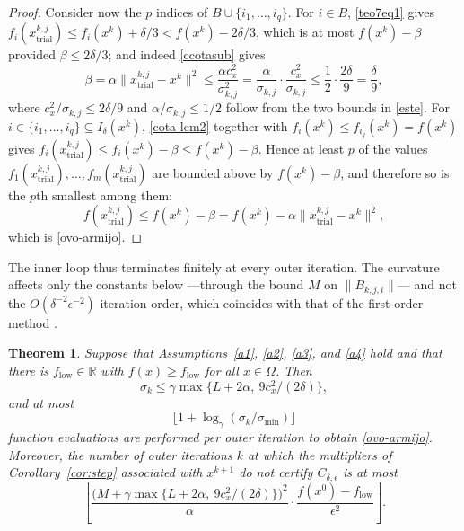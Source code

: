 \documentclass[11pt]{article}
\newcommand{\xkjtrial}{x^{k,j}_{\mathrm{trial}}}
\newcommand{\flow}{f_{\mathrm{low}}}
\newtheorem{theorem}{Theorem}[section]
\begin{document}
\begin{proof}
Consider now the $p$ indices of $B \cup \{i_1, \ldots, i_q\}$. For $i \in B$,
\eqref{teo7eq1} gives
$f_i(\xkjtrial) \leq f_i(x^k) + \delta/3 < f(x^k) - 2\delta/3$, which is at
most $f(x^k) - \beta$ provided $\beta \leq 2\delta/3$; and indeed
\eqref{ccotasub} gives
\[
\beta = \alpha \|\xkjtrial - x^k\|^2 \leq \frac{\alpha c_x^2}{\sigma_{k,j}^2}
= \frac{\alpha}{\sigma_{k,j}} \cdot \frac{c_x^2}{\sigma_{k,j}}
\leq \frac{1}{2} \cdot \frac{2\delta}{9} = \frac{\delta}{9},
\]
where $c_x^2/\sigma_{k,j} \leq 2\delta/9$ and $\alpha/\sigma_{k,j} \leq 1/2$
follow from the two bounds in \eqref{este}. For
$i \in \{i_1, \ldots, i_q\} \subseteq I_\delta(x^k)$, \eqref{cota-lem2} together
with $f_i(x^k) \leq f_{i_q}(x^k) = f(x^k)$ gives
$f_i(\xkjtrial) \leq f_i(x^k) - \beta \leq f(x^k) - \beta$. Hence at least $p$
of the values $f_1(\xkjtrial), \ldots, f_m(\xkjtrial)$ are bounded above by
$f(x^k) - \beta$, and therefore so is the $p$th smallest among them:
\[
f(\xkjtrial) \leq f(x^k) - \beta = f(x^k) - \alpha\|\xkjtrial - x^k\|^2,
\]
which is \eqref{ovo-armijo}.
\end{proof}

The inner loop thus terminates finitely at every outer iteration. The curvature
affects only the constants below ---through the bound $M$ on $\|B_{k,j,i}\|$--- and
not the $O(\delta^{-2}\epsilon^{-2})$ iteration order, which coincides with that
of the first-order method \cite{alvarezovo}.

\begin{theorem} \label{teo:complexity}
Suppose that Assumptions~\ref{a1}, \ref{a2}, \ref{a3}, and \ref{a4} hold and
that there is
$\flow \in \mathbb{R}$ with $f(x) \geq \flow$ for all $x \in \Omega$. Then
\begin{equation} \label{cota-sigma}
\sigma_k \leq \gamma \max\{ L + 2\alpha,\ 9c_x^2/(2\delta) \},
\end{equation}
and at most
\begin{equation} \label{cota-fcnt}
\big\lfloor 1 + \log_\gamma( \sigma_k / \sigma_{\min} ) \big\rfloor
\end{equation}
function evaluations are performed per outer iteration to obtain
\eqref{ovo-armijo}. Moreover, the number of outer iterations $k$ at which the
multipliers of Corollary~\ref{cor:step} associated with $x^{k+1}$ do not
certify $C_{\delta,\epsilon}$ is at most
\begin{equation} \label{cota-iter}
\left\lfloor \frac{\big( M + \gamma \max\{ L + 2\alpha,\ 9c_x^2/(2\delta) \}
\big)^2}{\alpha} \cdot \frac{f(x^0) - \flow}{\epsilon^2} \right\rfloor.
\end{equation}
\end{theorem}
\end{document}
